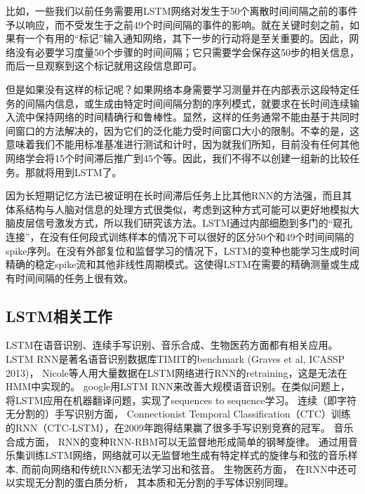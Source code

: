 比如，一些我们以前任务需要用LSTM网络对发生于50个离散时间间隔之前的事件予以响应，而不受发生于之前49个时间间隔的事件的影响。就在关键时刻之前，如果有一个有用的“标记”输入通知网络，其下一步的行动将是至关重要的。因此，网络没有必要学习度量50个步骤的时间间隔；它只需要学会保存这50步的相关信息，而后一旦观察到这个标记就用这段信息即可。

但是如果没有这样的标记呢？如果网络本身需要学习测量并在内部表示这段特定任务的间隔内信息，或生成由特定时间间隔分割的序列模式，就要求在长时间连续输入流中保持网络的时间精确行和鲁棒性。显然，这样的任务通常不能由基于共同时间窗口的方法解决的，因为它们的泛化能力受时间窗口大小的限制。不幸的是，这意味着我们不能用标准基准进行测试和计时，因为就我们所知，目前没有任何其他网络学会将15个时间滞后推广到45个等。因此，我们不得不以创建一组新的比较任务。那就将用到LSTM了。

因为长短期记忆方法已被证明在长时间滞后任务上比其他RNN的方法强，而且其体系结构与人脑对信息的处理方式很类似，考虑到这种方式可能可以更好地模拟大脑皮层信号激发方式，所以我们研究该方法。LSTM通过内部细胞到多门的“窥孔连接”，在没有任何段式训练样本的情况下可以很好的区分50个和49个时间间隔的spike序列。在没有外部复位和监督学习的情况下，LSTM的变种也能学习生成时间精确的稳定spike流和其他非线性周期模式。这使得LSTM在需要的精确测量或生成有时间间隔的任务上很有效。


\subsection{LSTM相关工作}

LSTM在语音识别、连续手写识别、音乐合成、生物医药方面都有相关应用。 LSTM RNN是著名语音识别数据库TIMIT的benchmark (Graves et al, ICASSP 2013)， Nicole等人用大量数据在LSTM网络进行RNN的retraining\cite{beringer2005classifying}，这是无法在HMM中实现的。 google用LSTM RNN来改善大规模语音识别\cite{sak2014long}。在类似问题上，\cite{sutskever2014sequence}将LSTM应用在机器翻译问题，实现了sequences to sequence学习。 连续（即字符无分割的）手写识别方面，  Connectionist Temporal Classification（CTC）\cite{graves2012connectionist}训练的RNN（CTC-LSTM）\cite{bluche2014a2ia}，在2009年跑得结果赢了很多手写识别竞赛的冠军\cite{graves2006connectionist}。 音乐合成方面， RNN的变种RNN-RBM可以无监督地形成简单的钢琴旋律\cite{boulanger2012modeling}。 通过用音乐集训练LSTM网络，网络就可以无监督地生成有特定样式的旋律与和弦的音乐样本, 而前向网络和传统RNN都无法学习出和弦音\cite{eck2002first}。 生物医药方面， 在RNN中还可以实现无分割的蛋白质分析\cite{hochreiter2007fast}， 其本质和无分割的手写体识别同理。





